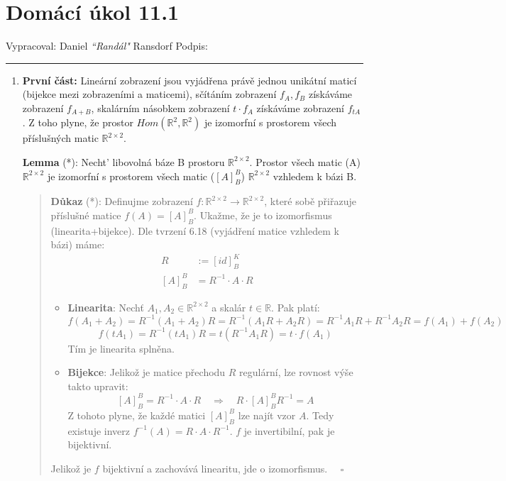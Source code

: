 \documentclass[12pt]{article}
\begin{document}
\section*{Domácí úkol 11.1}

Vypracoval: Daniel \textit{``Randál"} Ransdorf \hfill Podpis: \rule{4cm}{0.4pt}

\begin{enumerate}
  
  \item \textbf{První část:} Lineární zobrazení jsou vyjádřena právě jednou unikátní maticí (bijekce mezi zobrazeními a maticemi), sčítáním zobrazení $f_A,f_B$
    získáváme zobrazení $f_{A+B}$, skalárním násobkem zobrazení $t\cdot f_A$ získáváme zobrazení $f_{tA}$.
    Z toho plyne, že prostor $Hom(\mathbb{R}^2,\mathbb{R}^2)$ je izomorfní s prostorem všech příslušných matic $\mathbb{R}^{2\times2}$.
    
    \textbf{Lemma} (*): Necht' libovolná báze B prostoru $\mathbb{R}^{2\times2}$. Prostor všech matic (A) $\mathbb{R}^{2\times2}$ je izomorfní
      s prostorem všech matic ($[A]^B_B$) $\mathbb{R}^{2\times2}$ vzhledem k bázi B.

    \begin{quote}
      \textbf{Důkaz} (*): Definujme zobrazení $f: \mathbb{R}^{2\times2} \to \mathbb{R}^{2\times2}$, které
        sobě přiřazuje příslušné matice $f(A) = [A]^B_B$.
        Ukažme, že je to izomorfismus (linearita+bijekce). Dle tvrzení 6.18 (vyjádření matice vzhledem k bázi) máme:
          \begin{align*}
            R &:= [id]^K_B \\
            [A]^B_B &= R^{-1} \cdot A \cdot R
          \end{align*}
        \begin{itemize}
          \item \textbf{Linearita}: Nechť $A_1,A_2 \in \mathbb{R}^{2\times2}$ a skalár $t\in\mathbb{R}$.
            Pak platí:
              \[
                f(A_1+A_2) = R^{-1} (A_1+A_2) R = R^{-1} (A_1R + A_2R) = R^{-1} A_1R + R^{-1} A_2R = f(A_1) + f(A_2)
              \]
              \[
                f(tA_1) = R^{-1} (tA_1) R = t(R^{-1} A_1 R) = t\cdot f(A_1)
              \]
            Tím je linearita splněna.
          \item \textbf{Bijekce}: Jelikož je matice přechodu $R$ regulární, lze rovnost výše takto upravit:
              \[
                [A]^B_B = R^{-1} \cdot A \cdot R \quad \Longrightarrow \quad R \cdot [A]^B_B  R^{-1} = A
              \]
            Z tohoto plyne, že každé matici $[A]^B_B$ lze najít vzor $A$. Tedy existuje inverz $f^{-1}(A)=R \cdot A \cdot R^{-1}$.
            $f$ je invertibilní, pak je bijektivní.
        \end{itemize}
        Jelikož je $f$ bijektivní a zachovává linearitu, jde o izomorfismus. $\quad \square$
    \end{quote}


\end{enumerate}
\end{document}
